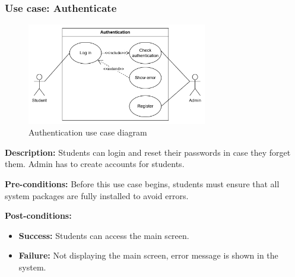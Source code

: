 \documentclass{article}
\begin{document}
\subsubsection{Use case: Authenticate}
    \begin{figure}[H]
        \centering
        \includegraphics[width=0.7\textwidth]{image/AuthenticationUseCase.png} 
        \caption{Authentication use case diagram}
        \label{fig:authenticate_use_case}
    \end{figure}
    \textbf{Description:} Students can login and reset their passwords in case they forget them. Admin has to create accounts for students.

    \noindent \textbf{Pre-conditions:} Before this use case begins, students must ensure that all system packages are fully installed to avoid errors.

    \noindent \textbf{Post-conditions:}
    \begin{itemize}
        \item \textbf{Success:} Students can access the main screen.
        \item \textbf{Failure:} Not displaying the main screen, error message is shown in the system.
    \end{itemize}
\end{document}
